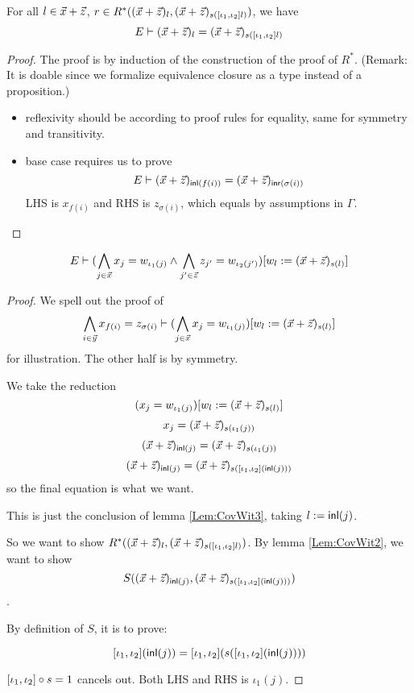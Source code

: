 \begin{lemma}\label{Lem:CovWit3}
  For all $l\in \vec{x}+\vec{z}$, $r\in R^*((\vec{x}+\vec{z})_l,(\vec{x}+\vec{z})_{s([\iota_1,\iota_2] l)})$, we have
  \begin{equation*}
    E \vdash (\vec{x}+\vec{z})_l = (\vec{x}+\vec{z})_{s([\iota_1,\iota_2] l)}
  \end{equation*}
\end{lemma}

\begin{proof}
  The proof is by induction of the construction of the proof of $R^*$. (Remark: It is doable since we formalize equivalence closure 
  as a type instead of a proposition.)

\begin{itemize}
    \item reflexivity should be according to proof rules for equality, same for symmetry and transitivity.
    \item base case requires us to prove
    \[E\vdash (\vec{x}+\vec{z})_{\mathsf{inl}(f(i))} = (\vec{x}+\vec{z})_{\mathsf{inr}(\sigma(i))}\]
    LHS is $x_{f(i)}$ and RHS is $z_{\sigma(i)}$, which equals by assumptions in $\Gamma$.
\end{itemize}
\end{proof}

\begin{lemma}\label{Lem:CovWit4}
  \begin{equation*}
    E \vdash (\bigwedge_{j\in\vec{x}}x_j = w_{\iota_1(j)}\land \bigwedge_{j'\in\vec{z}}z_{j'}= w_{\iota_2(j')}) [w_l:=(\vec{x}+\vec{z})_{s(l)}]
  \end{equation*}
\end{lemma}
\begin{proof}
  We spell out the proof of 
  \begin{equation*}
    \bigwedge_{i\in \vec{y}} x_{f(i)} = z_{\sigma(i)} \vdash 
     (\bigwedge_{j\in\vec{x}}x_j = w_{\iota_1(j)}) [w_l:=(\vec{x}+\vec{z})_{s(l)}] 
   \end{equation*}
   for illustration. The other half is by symmetry.

  We take the reduction
\[(x_j = w_{\iota_1(j)}) [w_l:=(\vec{x}+\vec{z})_{s(l)}]\]
\[x_j = (\vec{x}+\vec{z})_{s(\iota_1(j))}\]
\[(\vec{x}+\vec{z})_{\mathsf{inl}(j)} = (\vec{x}+\vec{z})_{s(\iota_1(j))}\]
\[(\vec{x}+\vec{z})_{\mathsf{inl}(j)} = (\vec{x}+\vec{z})_{s([\iota_1,\iota_2] (\mathsf{inl}(j)))}\]
so the final equation is what we want.

This is just the conclusion of lemma \ref{Lem:CovWit3}, taking $l := \mathsf{inl}(j)$.

So we want to show $R^*((\vec{x}+\vec{z})_l,(\vec{x}+\vec{z})_{s([\iota_1,\iota_2] l)})$. By lemma \ref{Lem:CovWit2}, we want to show \[S((\vec{x}+\vec{z})_{\mathsf{inl}(j)},(\vec{x}+\vec{z})_{s([\iota_1,\iota_2] (\mathsf{inl}(j)))})\].

By definition of $S$, it is to prove:

\[[\iota_1,\iota_2] (\mathsf{inl}(j)) = [\iota_1,\iota_2] (s([\iota_1,\iota_2] (\mathsf{inl}(j)))) \]

$[\iota_1,\iota_2]\circ s = 1$ cancels out. Both LHS and RHS is $\iota_1(j)$.

\end{proof}



